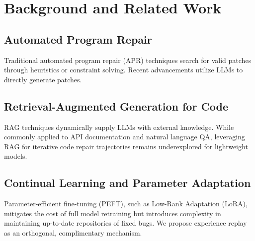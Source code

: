 \section{Background and Related Work}
\subsection{Automated Program Repair}
Traditional automated program repair (APR) techniques search for valid patches through heuristics or constraint solving. Recent advancements utilize LLMs to directly generate patches. 

\subsection{Retrieval-Augmented Generation for Code}
RAG techniques dynamically supply LLMs with external knowledge. While commonly applied to API documentation and natural language QA, leveraging RAG for iterative code repair trajectories remains underexplored for lightweight models.

\subsection{Continual Learning and Parameter Adaptation}
Parameter-efficient fine-tuning (PEFT), such as Low-Rank Adaptation (LoRA), mitigates the cost of full model retraining but introduces complexity in maintaining up-to-date repositories of fixed bugs. We propose experience replay as an orthogonal, complimentary mechanism.
